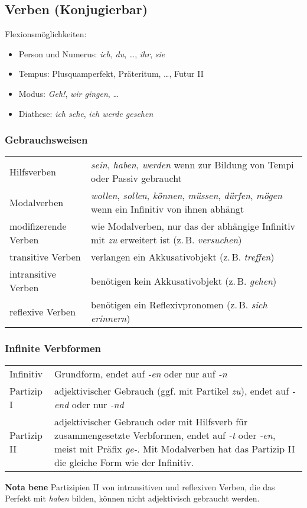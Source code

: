 \subsection{Verben (Konjugierbar)}
Flexionsmöglichkeiten:
\begin{itemize}\itemsep0em
	\item Person und Numerus: \textit{ich}, \textit{du}, \dots, \textit{ihr}, \textit{sie}
	\item Tempus: Plusquamperfekt, Präteritum, \dots, Futur II
	\item Modus: \textit{Geh!}, \textit{wir gingen}, \dots
	\item Diathese: \textit{ich sehe}, \textit{ich werde gesehen}
\end{itemize}

\subsubsection{Gebrauchsweisen}
\settowidth{\MyLenA}{intransitive Verben~~}
\begin{tabular}{@{}p{\the\MyLenA}%
				@{}p{\linewidth-\the\MyLenA}}
	Hilfsverben & \textit{sein}, \textit{haben}, \textit{werden} wenn zur Bildung von Tempi oder Passiv gebraucht\\
	Modalverben & \textit{wollen}, \textit{sollen}, \textit{können}, \textit{müssen}, \textit{dürfen}, \textit{mögen} wenn ein Infinitiv von ihnen abhängt\\
	modifizerende Verben & wie Modalverben, nur das der abhängige Infinitiv mit \textit{zu} erweitert ist (z.\,B. \textit{versuchen})\\
	transitive Verben & verlangen ein Akkusativobjekt (z.\,B. \textit{treffen})\\
	intransitive Verben & benötigen kein Akkusativobjekt (z.\,B. \textit{gehen})\\
	reflexive Verben & benötigen ein Reflexivpronomen (z.\,B. \textit{sich erinnern})\\
\end{tabular}

\subsubsection{Infinite Verbformen}
\settowidth{\MyLenA}{Partizip II~~}
\begin{tabular}{@{}p{\the\MyLenA}%
				@{}p{\linewidth-\the\MyLenA}}
	Infinitiv & Grundform, endet auf \textit{-en} oder nur auf \textit{-n}\\
	Partizip I & adjektivischer Gebrauch (ggf. mit Partikel \textit{zu}), endet auf \textit{-end} oder nur \textit{-nd}\\
	Partizip II & adjektivischer Gebrauch oder mit Hilfsverb für zusammengesetzte Verbformen, endet auf \textit{-t} oder \textit{-en}, meist mit Präfix \textit{ge-}. Mit Modalverben hat das Partizip II die gleiche Form wie der Infinitiv.\\
\end{tabular}
\textbf{Nota bene} Partizipien II von intransitiven und reflexiven Verben, die das Perfekt mit \textit{haben} bilden, können nicht adjektivisch gebraucht werden.\\


